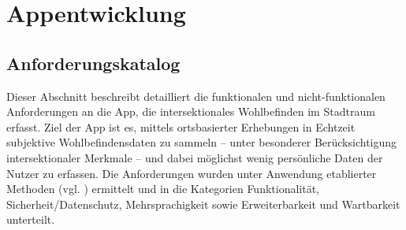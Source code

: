 \section{Appentwicklung}
\subsection{Anforderungskatalog}

Dieser Abschnitt beschreibt detailliert die funktionalen und nicht-funktionalen Anforderungen an die App, die intersektionales Wohlbefinden im Stadtraum erfasst. Ziel der App ist es, mittels ortsbasierter Erhebungen in Echtzeit subjektive Wohlbefindensdaten zu sammeln – unter besonderer Berücksichtigung intersektionaler Merkmale – und dabei möglichst wenig persönliche Daten der Nutzer zu erfassen. Die Anforderungen wurden unter Anwendung etablierter Methoden (vgl. \cite{clegg_case_1994}) ermittelt und in die Kategorien Funktionalität, Sicherheit/Datenschutz, Mehrsprachigkeit sowie Erweiterbarkeit und Wartbarkeit unterteilt.


